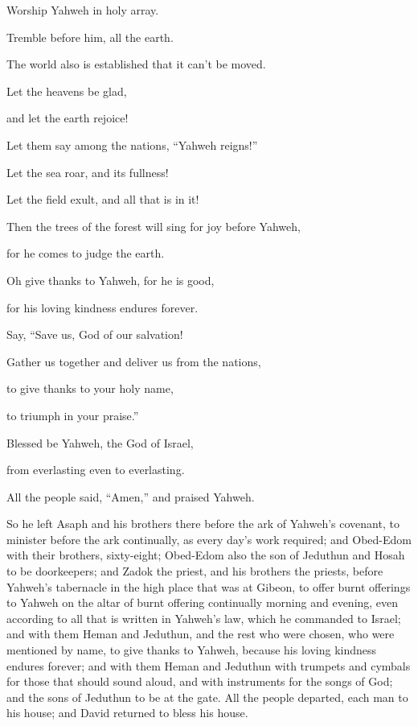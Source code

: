 {\par }{\QB Worship Yahweh in holy array.
\par }{\Q {}Tremble before him, all the earth.
\par }{\QB The world also is established that it can’t be moved.
\par }{\Q {}Let the heavens be glad,
\par }{\QB and let the earth rejoice!
\par }{\QB Let them say among the nations, “Yahweh reigns!”
\par }{\Q {}Let the sea roar, and its fullness!
\par }{\QB Let the field exult, and all that is in it!
\par }{\Q {}Then the trees of the forest will sing for joy before Yahweh,
\par }{\QB for he comes to judge the earth.
\par }{\Q {}Oh give thanks to Yahweh, for he is good,
\par }{\QB for his loving kindness endures forever.
\par }{\Q {}Say, “Save us, God of our salvation!
\par }{\QB Gather us together and deliver us from the nations,
\par }{\QB to give thanks to your holy name,
\par }{\QB to triumph in your praise.”
\par }{\Q {}Blessed be Yahweh, the God of Israel,
\par }{\QB from everlasting even to everlasting.
\par }{\PP All the people said, “Amen,” and praised Yahweh.
\par }{\PP {}So he left Asaph and his brothers there before the ark of Yahweh’s covenant, to minister before the ark continually, as every day’s work required;
and Obed-Edom with their brothers, sixty-eight; Obed-Edom also the son of Jeduthun and Hosah to be doorkeepers;
and Zadok the priest, and his brothers the priests, before Yahweh’s tabernacle in the high place that was at Gibeon,
to offer burnt offerings to Yahweh on the altar of burnt offering continually morning and evening, even according to all that is written in Yahweh’s law, which he commanded to Israel;
and with them Heman and Jeduthun, and the rest who were chosen, who were mentioned by name, to give thanks to Yahweh, because his loving kindness endures forever;
and with them Heman and Jeduthun with trumpets and cymbals for those that should sound aloud, and with instruments for the songs of God; and the sons of Jeduthun to be at the gate.
All the people departed, each man to his house; and David returned to bless his house.

}

